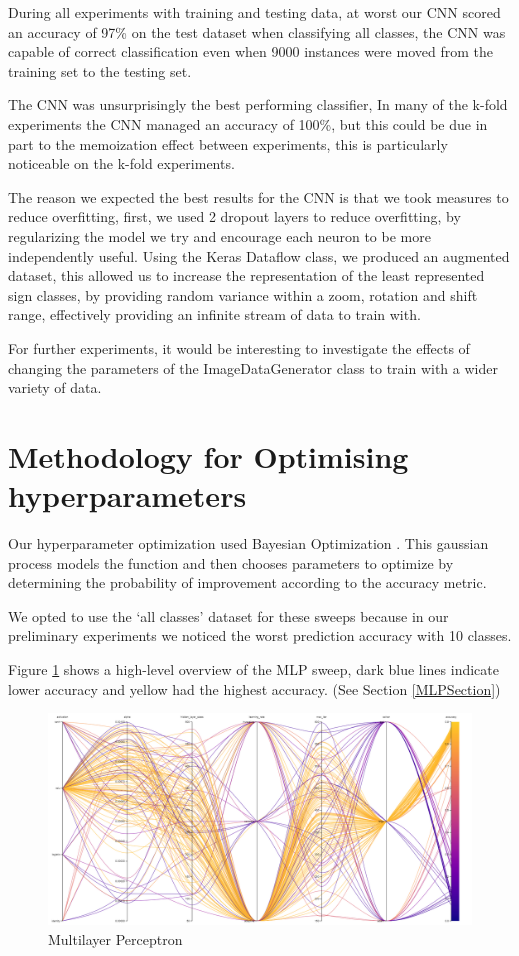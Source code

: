 \documentclass[11pt]{article}
\begin{document}
During all experiments with training and testing data, at worst our CNN scored an accuracy of 97\% on the test dataset when classifying all classes, the CNN was capable of correct classification even when 9000 instances were moved from the training set to the testing set.

The CNN was unsurprisingly the best performing classifier, In many of the k-fold experiments the CNN managed an accuracy of 100\%, but this could be due in part to the memoization effect between experiments, this is particularly noticeable on the k-fold experiments.

The reason we expected the best results for the CNN is that we took measures to reduce overfitting, first, we used 2 dropout layers to reduce overfitting, by regularizing the model we try and encourage each neuron to be more independently useful.
Using the Keras Dataflow class, we produced an augmented dataset, this allowed us to increase the representation of the least represented sign classes, by providing random variance within a zoom, rotation and shift range, effectively providing an infinite stream of data to train with.

For further experiments, it would be interesting to investigate the effects of changing the parameters of the ImageDataGenerator class to train with a wider variety of data.

\newpage
\section{Methodology for Optimising hyperparameters}

Our hyperparameter optimization used Bayesian Optimization \cite{Configuration}. This gaussian process models the function and then chooses parameters to optimize by determining the probability of improvement according to the accuracy metric. 
\par
We opted to use the ‘all classes’ dataset for these sweeps because in our preliminary experiments we noticed the worst prediction accuracy with 10 classes.

Figure \ref{MLPLineGraph} shows a high-level overview of the MLP sweep, dark blue lines indicate lower accuracy and yellow had the highest accuracy. (See Section \ref{MLPSection})

\begin{figure}[h]
  \caption {Multilayer Perceptron} \label{MLPLineGraph}
  \centering 
  \includegraphics[width = \textwidth, height = 0.3\textheight, keepaspectratio]{Images/MLP ParallelCoordGraph.png}
\end{figure}
\end{document}
